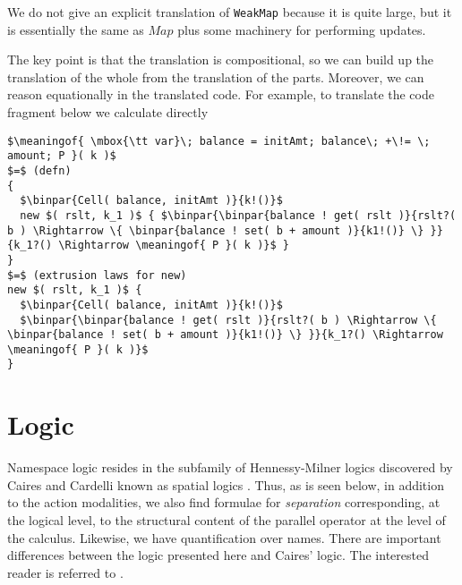 \documentclass[]{amsart}
\newcommand{\ldb}{[\![}
\newcommand{\rdb}{]\!]}
\newcommand{\id}[1]{\texttt{#1}}
\newcommand{\juxtap}{\mathbin{\id{|}}}
\newcommand{\binpar}[2]{#1 \juxtap #2}
\newcommand{\meaningof}[1]{\ldb #1 \rdb}
\theoremstyle{definition}
\theoremstyle{remark}
\numberwithin{equation}{subsection}
\begin{document}
We do not give an explicit translation of {\tt WeakMap} because it is quite
large, but it is essentially the same as $Map$ plus some machinery for performing
updates.



The key point is that the translation is compositional, so we can
build up the translation of the whole from the translation of the
parts. Moreover, we can reason equationally in the translated
code. For example, to translate the code fragment below we calculate
directly


\begin{lstlisting}[mathescape]
$\meaningof{ \mbox{\tt var}\; balance = initAmt; balance\; +\!= \; amount; P }( k )$
$=$ (defn)
{ 
  $\binpar{Cell( balance, initAmt )}{k!()}$
  new $( rslt, k_1 )$ { $\binpar{\binpar{balance ! get( rslt )}{rslt?( b ) \Rightarrow \{ \binpar{balance ! set( b + amount )}{k1!()} \} }}{k_1?() \Rightarrow \meaningof{ P }( k )}$ }
}
$=$ (extrusion laws for new)
new $( rslt, k_1 )$ {
  $\binpar{Cell( balance, initAmt )}{k!()}$
  $\binpar{\binpar{balance ! get( rslt )}{rslt?( b ) \Rightarrow \{ \binpar{balance ! set( b + amount )}{k1!()} \} }}{k_1?() \Rightarrow \meaningof{ P }( k )}$
}
\end{lstlisting}

\section{Logic}
Namespace logic resides in the subfamily of Hennessy-Milner logics
discovered by Caires and Cardelli known as spatial logics
\cite{DBLP:conf/fossacs/Caires04}. Thus, as is seen below, in addition
to the action modalities, we also find formulae for \emph{separation}
corresponding, at the logical level, to the structural content of the
parallel operator at the level of the calculus. Likewise, we have
quantification over names. There are important differences between the
logic presented here and Caires' logic. The interested reader is
referred to \cite{DBLP:conf/tgc/MeredithR05}.
\end{document}
